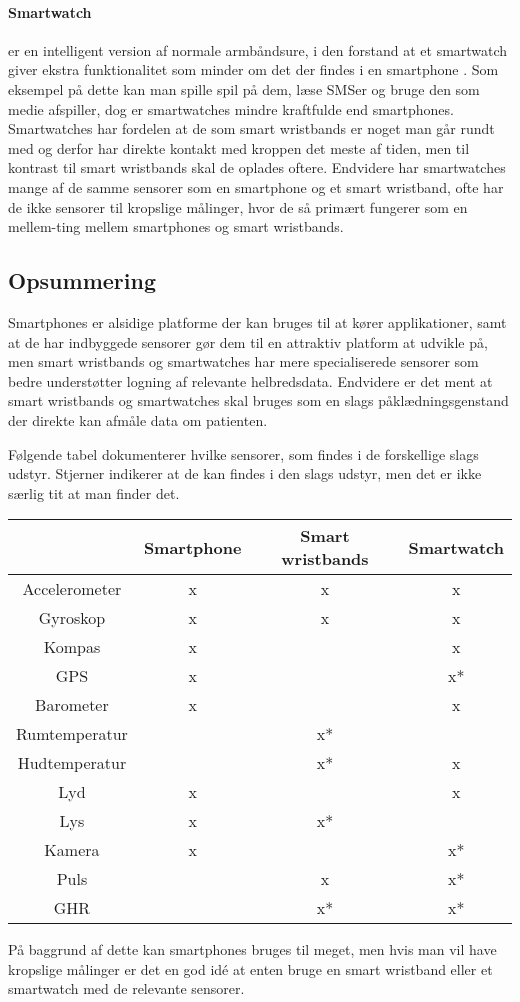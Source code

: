 \paragraph{Smartwatch}
 er en intelligent version af normale armbåndsure, i den forstand at et smartwatch giver ekstra funktionalitet som minder om det der findes i en smartphone \citep{msic:smartwatchstate}. 
Som eksempel på dette kan man spille spil på dem, læse SMSer og bruge den som medie afspiller, dog er smartwatches mindre kraftfulde end smartphones. 
Smartwatches har fordelen at de som smart wristbands er noget man går rundt med og derfor har direkte kontakt med kroppen det meste af tiden, men til kontrast til smart wristbands skal de oplades oftere. 
Endvidere har smartwatches mange af de samme sensorer som en smartphone og et smart wristband, ofte har de ikke sensorer til kropslige målinger, hvor de så primært fungerer som en mellem-ting mellem smartphones og smart wristbands.

\subsection{Opsummering}
Smartphones er alsidige platforme der kan bruges til at kører applikationer, samt at de har indbyggede sensorer gør dem til en attraktiv platform at udvikle på, men smart wristbands og smartwatches har mere specialiserede sensorer som bedre understøtter logning af relevante helbredsdata.
Endvidere er det ment at smart wristbands og smartwatches skal bruges som en slags påklædningsgenstand der direkte kan afmåle data om patienten.

Følgende tabel dokumenterer hvilke sensorer, som findes i de forskellige slags udstyr. Stjerner indikerer at de kan findes i den slags udstyr, men det er ikke særlig tit at man finder det. %

\begin{table}
\centering
\begin{tabular}{|c|c|c|c|}
\hline  			 & Smartphone 	& Smart wristbands 	& Smartwatch 	\\ 
\hline Accelerometer &  x		  	&  			x	 	&  		x  		\\ 
\hline Gyroskop		 &	x			&			x		&		x		\\
\hline Kompas		 &  x			&					&		x		\\
\hline GPS			 &	x			&					&		x*		\\
\hline Barometer	 &	x			&					&		x		\\
\hline Rumtemperatur &				&			x*		&				\\
\hline Hudtemperatur &				&			x*		&		x		\\
\hline Lyd			 &	x			&					&		x		\\
\hline Lys			 &	x			&			x*		&				\\
\hline Kamera		 &	x			&					&		x*		\\
\hline Puls			 &				&			x		&		x*		\\
\hline GHR			 &				&			x*		&		x*		\\ \hline
\end{tabular} 
\end{table}

På baggrund af dette kan smartphones bruges til meget, men hvis man vil have kropslige målinger er det en god idé at enten bruge en smart wristband eller et smartwatch med de relevante sensorer.
